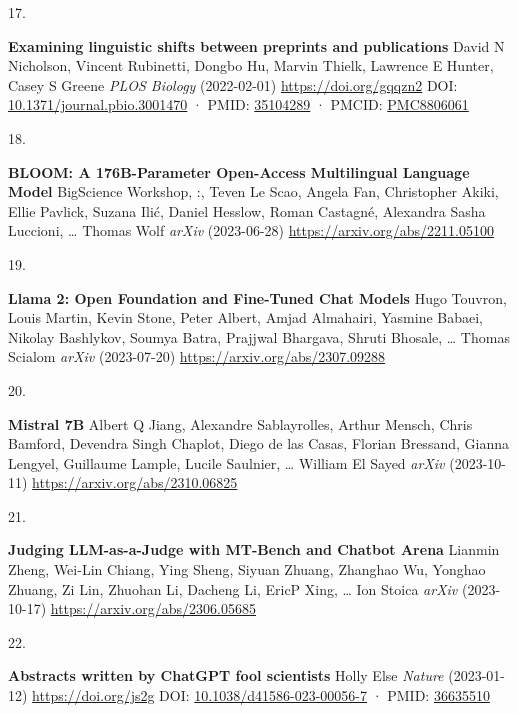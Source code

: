 \documentclass[
]{article}
\newlength{\cslhangindent}
\newlength{\csllabelwidth}
\newlength{\cslentryspacingunit} %
\newenvironment{CSLReferences}[2] %
 {%
  \setlength{\parindent}{0pt}
  \ifodd #1
  \let\oldpar\par
  \def\par{\hangindent=\cslhangindent\oldpar}
  \fi
  \setlength{\parskip}{#2\cslentryspacingunit}
 }%
 {}
\newcommand{\CSLBlock}[1]{#1\hfill\break}
\newcommand{\CSLLeftMargin}[1]{\parbox[t]{\csllabelwidth}{#1}}
\newcommand{\CSLRightInline}[1]{\parbox[t]{\linewidth - \csllabelwidth}{#1}\break}
\begin{document}
\begin{CSLReferences}{0}{0}
\leavevmode{}%
\CSLLeftMargin{17. }%
\CSLRightInline{\textbf{Examining linguistic shifts between preprints and publications}
\CSLBlock{David N Nicholson, Vincent Rubinetti, Dongbo Hu, Marvin Thielk, Lawrence E Hunter, Casey S Greene} \emph{PLOS Biology} (2022-02-01) \url{https://doi.org/gqqzn2}
\CSLBlock{DOI: \href{https://doi.org/10.1371/journal.pbio.3001470}{10.1371/journal.pbio.3001470} · PMID: \href{https://www.ncbi.nlm.nih.gov/pubmed/35104289}{35104289} · PMCID: \href{https://www.ncbi.nlm.nih.gov/pmc/articles/PMC8806061}{PMC8806061}}}

\leavevmode{}%
\CSLLeftMargin{18. }%
\CSLRightInline{\textbf{BLOOM: A 176B-Parameter Open-Access Multilingual Language Model}
\CSLBlock{BigScience Workshop, :, Teven Le Scao, Angela Fan, Christopher Akiki, Ellie Pavlick, Suzana Ilić, Daniel Hesslow, Roman Castagné, Alexandra Sasha Luccioni, \ldots{} Thomas Wolf} \emph{arXiv} (2023-06-28) \url{https://arxiv.org/abs/2211.05100}}

\leavevmode{}%
\CSLLeftMargin{19. }%
\CSLRightInline{\textbf{Llama 2: Open Foundation and Fine-Tuned Chat Models}
\CSLBlock{Hugo Touvron, Louis Martin, Kevin Stone, Peter Albert, Amjad Almahairi, Yasmine Babaei, Nikolay Bashlykov, Soumya Batra, Prajjwal Bhargava, Shruti Bhosale, \ldots{} Thomas Scialom} \emph{arXiv} (2023-07-20) \url{https://arxiv.org/abs/2307.09288}}

\leavevmode{}%
\CSLLeftMargin{20. }%
\CSLRightInline{\textbf{Mistral 7B}
\CSLBlock{Albert Q Jiang, Alexandre Sablayrolles, Arthur Mensch, Chris Bamford, Devendra Singh Chaplot, Diego de las Casas, Florian Bressand, Gianna Lengyel, Guillaume Lample, Lucile Saulnier, \ldots{} William El Sayed} \emph{arXiv} (2023-10-11) \url{https://arxiv.org/abs/2310.06825}}

\leavevmode{}%
\CSLLeftMargin{21. }%
\CSLRightInline{\textbf{Judging LLM-as-a-Judge with MT-Bench and Chatbot Arena}
\CSLBlock{Lianmin Zheng, Wei-Lin Chiang, Ying Sheng, Siyuan Zhuang, Zhanghao Wu, Yonghao Zhuang, Zi Lin, Zhuohan Li, Dacheng Li, EricP Xing, \ldots{} Ion Stoica} \emph{arXiv} (2023-10-17) \url{https://arxiv.org/abs/2306.05685}}

\leavevmode{}%
\CSLLeftMargin{22. }%
\CSLRightInline{\textbf{Abstracts written by ChatGPT fool scientists}
\CSLBlock{Holly Else} \emph{Nature} (2023-01-12) \url{https://doi.org/js2g}
\CSLBlock{DOI: \href{https://doi.org/10.1038/d41586-023-00056-7}{10.1038/d41586-023-00056-7} · PMID: \href{https://www.ncbi.nlm.nih.gov/pubmed/36635510}{36635510}}}


\end{CSLReferences}
\end{document}

